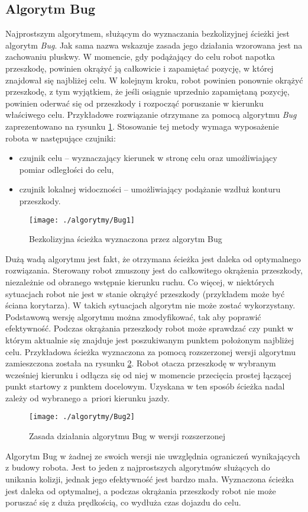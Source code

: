 \subsection{Algorytm Bug}
	Najprostszym algorytmem, służącym do wyznaczania bezkolizyjnej ścieżki jest algorytm \emph{Bug}. Jak sama nazwa wskazuje zasada jego działania wzorowana
	jest na zachowaniu pluskwy. W momencie, gdy podążający do celu robot napotka przeszkodę, powinien okrążyć ją całkowicie i zapamiętać pozycję, w której znajdował
	się najbliżej celu. W kolejnym kroku, robot powinien ponownie okrążyć przeszkodę, z tym wyjątkiem, że jeśli osiągnie uprzednio zapamiętaną pozycję, powinien oderwać się od przeszkody
	i rozpocząć poruszanie w kierunku właściwego celu. Przykładowe rozwiązanie otrzymane za pomocą algorytmu \emph{Bug} zaprezentowano na rysunku \ref{fig:Bug1}.
	Stosowanie tej metody wymaga wyposażenie robota w następujące czujniki:
	\begin{itemize}
	\item czujnik celu -- wyznaczający kierunek w stronę celu oraz umożliwiający pomiar odległości do celu,
	\item czujnik lokalnej widoczności -- umożliwiający  podążanie wzdłuż konturu przeszkody. 
	\end{itemize}
	\begin{figure}[h]
	\centering
	\texttt{[image: ./algorytmy/Bug1]}
	\caption{ Bezkolizyjna ścieżka wyznaczona przez algorytm Bug }\label{fig:Bug1}
	\end{figure}
	Dużą wadą algorytmu jest fakt, że otrzymana ścieżka jest daleka od optymalnego rozwiązania. Sterowany robot zmuszony jest do całkowitego okrążenia przeszkody, niezależnie 
	od obranego wstępnie kierunku ruchu. Co więcej, w niektórych sytuacjach robot nie jest w stanie okrążyć przeszkody (przykładem może być ściana korytarza). 
	W takich sytuacjach algorytm nie może zostać wykorzystany.
	Podstawową wersję algorytmu można zmodyfikować, tak aby poprawić efektywność. Podczas okrążania przeszkody robot może sprawdzać czy punkt w którym aktualnie się znajduje jest poszukiwanym punktem położonym najbliżej celu. 
	Przykładowa ścieżka wyznaczona za pomocą rozszerzonej wersji algorytmu zamieszczona została na rysunku \ref{fig:Bug2}.
	Robot otacza przeszkodę w wybranym wcześniej kierunku i odłącza się od niej w momencie przecięcia
 	prostej łączącej punkt startowy z punktem docelowym. Uzyskana w ten sposób ścieżka nadal zależy od wybranego a~priori kierunku jazdy.	
	\begin{figure}
	\centering
	\texttt{[image: ./algorytmy/Bug2]}
	\caption{Zasada działania algorytmu Bug w wersji rozszerzonej}\label{fig:Bug2}
	\end{figure}
	Algorytm Bug w żadnej ze swoich wersji nie uwzględnia ograniczeń wynikających z budowy robota. Jest to jeden z najprostszych algorytmów służących do unikania
	kolizji, jednak jego efektywność jest bardzo mała. Wyznaczona ścieżka jest daleka od optymalnej, a podczas okrążania przeszkody robot nie może poruszać się z duża prędkością,
	co wydłuża czas dojazdu do celu.
